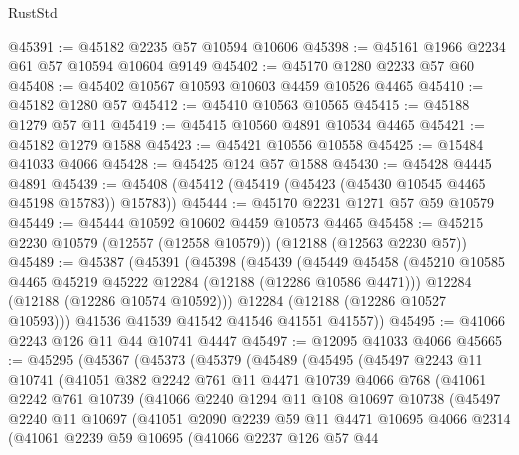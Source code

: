 \begin{lexlean}{RustStd}
\begin{coremodule}
@45391 := @45182 @2235 @57 @10594 @10606
@45398 := @45161 @1966 @2234 @61 @57 @10594 @10604 @9149
@45402 := @45170 @1280 @2233 @57 @60
@45408 := @45402 @10567 @10593 @10603 @4459 @10526 @4465
@45410 := @45182 @1280 @57
@45412 := @45410 @10563 @10565
@45415 := @45188 @1279 @57 @11
@45419 := @45415 @10560 @4891 @10534 @4465
@45421 := @45182 @1279 @1588
@45423 := @45421 @10556 @10558
@45425 := @15484 @41033 @4066
@45428 := @45425 @124 @57 @1588
@45430 := @45428 @4445 @4891
@45439 := @45408 (@45412 (@45419 (@45423 (@45430 @10545 @4465 @45198 @15783)) @15783))
@45444 := @45170 @2231 @1271 @57 @59 @10579
@45449 := @45444 @10592 @10602 @4459 @10573 @4465
@45458 := @45215 @2230 @10579 (@12557 (@12558 @10579)) (@12188 (@12563 @2230 @57))
@45489 := @45387
    (@45391
      (@45398
        (@45439
          (@45449
            @45458
            (@45210 @10585 @4465 @45219 @45222 @12284 (@12188 (@12286 @10586 @4471)))
            @12284
            (@12188 (@12286 @10574 @10592)))
          @12284
          (@12188 (@12286 @10527 @10593)))
        @41536
        @41539
        @41542
        @41546
        @41551
        @41557))
@45495 := @41066 @2243 @126 @11 @44 @10741 @4447
@45497 := @12095 @41033 @4066
@45665 := @45295
    (@45367
      (@45373
        (@45379
          (@45489
            (@45495
              (@45497
                @2243
                @11
                @10741
                (@41051
                  @382
                  @2242
                  @761
                  @11
                  @4471
                  @10739
                  @4066
                  @768
                  (@41061
                    @2242
                    @761
                    @10739
                    (@41066
                      @2240
                      @1294
                      @11
                      @108
                      @10697
                      @10738
                      (@45497
                        @2240
                        @11
                        @10697
                        (@41051
                          @2090
                          @2239
                          @59
                          @11
                          @4471
                          @10695
                          @4066
                          @2314
                          (@41061
                            @2239
                            @59
                            @10695
                            (@41066
                              @2237
                              @126
                              @57
                              @44

\end{coremodule}
\end{lexlean}
